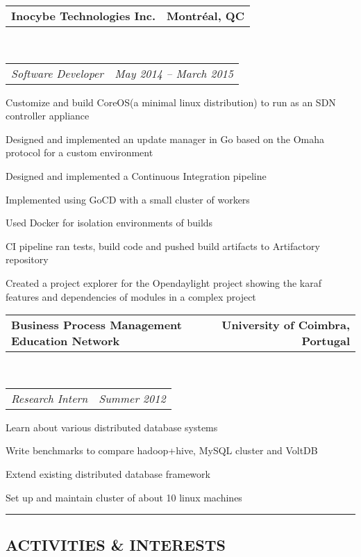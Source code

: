 \documentclass[10pt,letterpaper]{article}
\makeatletter
\newcommand{\headerrow}[2]
{\begin{tabular*}{\linewidth}{l@{\extracolsep{\fill}}r}
	#1 &
	#2 \\
\end{tabular*}}
\makeatother
\begin{document}
\begin{itemize}
	\item
	\headerrow
		{\textbf{Inocybe Technologies Inc.}}
		{\textbf{Montr\'{e}al, QC}}
	\\
	\headerrow
		{\emph{Software Developer}}
		{\emph{May 2014 -- March 2015}}
                \item Created a project explorer for the Opendaylight project showing the karaf features and dependencies of modules in a complex project
	\end{itemize*}

	\item
	\headerrow
		{\textbf{Business Process Management Education Network}}
		{\textbf{University of Coimbra, Portugal}}
	\\
	\headerrow
		{\emph{Research Intern}}
		{\emph{Summer 2012}}
	\begin{itemize*}
		\item Learn about various distributed database systems
		\item Write benchmarks to compare hadoop+hive, MySQL cluster and VoltDB
		\item Extend existing distributed database framework
		\item Set up and maintain cluster of about 10 linux machines
	\end{itemize*}

\end{itemize}

\hrule
\vspace{-0.4em}
\subsection*{ACTIVITIES \& INTERESTS}
\end{document}
